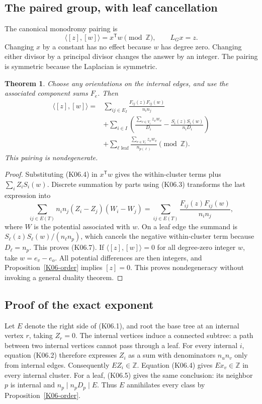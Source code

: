 \documentclass[11pt,a4paper]{article}
\newtheorem{theorem}{Theorem}[section]
\theoremstyle{definition}\newtheorem{definition}[theorem]{Definition}
\theoremstyle{remark}\newtheorem{remark}[theorem]{Remark}
\newcommand{\Z}{\mathbb Z}\newcommand{\Q}{\mathbb Q}\newcommand{\F}{\mathbb F}
\numberwithin{equation}{section}
\begin{document}
\subsection{The paired group, with leaf cancellation}\label{K06-sec-3}
The canonical monodromy pairing is
\[
 \langle[z],[w]\rangle=x^{\mathsf T}w\pmod{\Z},\qquad L_Gx=z.
\]
Changing $x$ by a constant has no effect because $w$ has degree zero. Changing either divisor by a principal divisor changes the answer by an integer. The pairing is symmetric because the Laplacian is symmetric.
\begin{theorem}\label{K06-pairing}
Choose any orientations on the internal edges, and use the associated component sums $F_e$. Then
\begin{align*}
\langle[z],[w]\rangle={}&
 \sum_{ij\in E_I}\frac{F_{ij}(z)F_{ij}(w)}{n_in_j}\\
 &+\sum_{i\in I}\left(
 \frac{\sum_{v\in V_i}z_vw_v}{D_i}
 -\frac{S_i(z)S_i(w)}{n_iD_i}\right)\\
 &+\sum_{\ell\text{ leaf}}
       \frac{\sum_{v\in V_\ell}z_vw_v}{n_{p(\ell)}}
                 \pmod{\Z}.                                 \tag{K06.7}
\end{align*}
This pairing is nondegenerate.
\end{theorem}
\begin{proof}
Substituting (K06.4) in $x^{\mathsf T}w$ gives the within-cluster terms plus $\sum_iZ_iS_i(w)$. Discrete summation by parts using (K06.3) transforms the last expression into
\[
 \sum_{ij\in E(T)}n_in_j(Z_i-Z_j)(W_i-W_j)
 =\sum_{ij\in E(T)}\frac{F_{ij}(z)F_{ij}(w)}{n_in_j},
\]
where $W$ is the potential associated with $w$. On a leaf edge the summand is $S_\ell(z)S_\ell(w)/(n_\ell n_p)$, which cancels the negative within-cluster term because $D_\ell=n_p$. This proves (K06.7). If $\langle[z],[w]\rangle=0$ for all degree-zero integer $w$, take $w=e_v-e_o$. All potential differences are then integers, and Proposition~\ref{K06-order} implies $[z]=0$. This proves nondegeneracy without invoking a general duality theorem.
\end{proof}

\subsection{Proof of the exact exponent}\label{K06-sec-4}
Let $E$ denote the right side of (K06.1), and root the base tree at an internal vertex $r$, taking $Z_r=0$. The internal vertices induce a connected subtree: a path between two internal vertices cannot pass through a leaf. For every internal $i$, equation (K06.2) therefore expresses $Z_i$ as a sum with denominators $n_un_v$ only from internal edges. Consequently $EZ_i\in\Z$. Equation (K06.4) gives $Ex_v\in\Z$ in every internal cluster. For a leaf, (K06.5) gives the same conclusion: its neighbor $p$ is internal and $n_p\mid n_pD_p\mid E$. Thus $E$ annihilates every class by Proposition~\ref{K06-order}.
\end{document}
